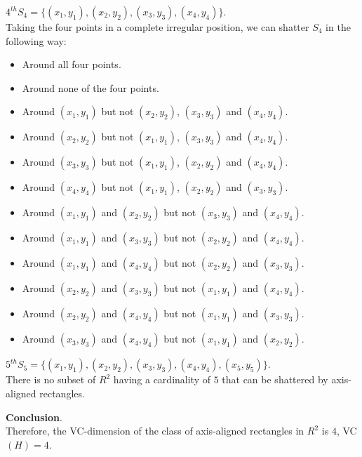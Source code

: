 \begin{example}[title = {Axis-Aligned Rectangles in $\mathbb{R}^2$}]
    $4^{th} S_4 = \{(x_1, y_1), (x_2, y_2), (x_3, y_3), (x_4, y_4)\}$. \\
    Taking the four points in a complete irregular position, we can shatter $S_4$ in the following way:
    \begin{itemize}
        \renewcommand{\labelitemi}{-}
        \item Around all four points.
        \item Around none of the four points.
        \item Around $(x_1, y_1)$ but not $(x_2, y_2)$, $(x_3, y_3)$ and $(x_4, y_4)$.
        \item Around $(x_2, y_2)$ but not $(x_1, y_1)$, $(x_3, y_3)$ and $(x_4, y_4)$.
        \item Around $(x_3, y_3)$ but not $(x_1, y_1)$, $(x_2, y_2)$ and $(x_4, y_4)$.
        \item Around $(x_4, y_4)$ but not $(x_1, y_1)$, $(x_2, y_2)$ and $(x_3, y_3)$.
        \item Around $(x_1, y_1)$ and $(x_2, y_2)$ but not $(x_3, y_3)$ and $(x_4, y_4)$.
        \item Around $(x_1, y_1)$ and $(x_3, y_3)$ but not $(x_2, y_2)$ and $(x_4, y_4)$.
        \item Around $(x_1, y_1)$ and $(x_4, y_4)$ but not $(x_2, y_2)$ and $(x_3, y_3)$.
        \item Around $(x_2, y_2)$ and $(x_3, y_3)$ but not $(x_1, y_1)$ and $(x_4, y_4)$.
        \item Around $(x_2, y_2)$ and $(x_4, y_4)$ but not $(x_1, y_1)$ and $(x_3, y_3)$.
        \item Around $(x_3, y_3)$ and $(x_4, y_4)$ but not $(x_1, y_1)$ and $(x_2, y_2)$.
    \end{itemize} \vspace{3.5pt}

    $5^{th} S_5 = \{(x_1, y_1), (x_2, y_2), (x_3, y_3), (x_4, y_4), (x_5, y_5)\}$. \\
    There is no subset of $R^2$ having a cardinality of $5$ that can be shattered by axis-aligned rectangles. \vspace{7pt}

    \textbf{Conclusion}. \\
    Therefore, the VC-dimension of the class of axis-aligned rectangles in $R^2$ is $4$, VC$(H) = 4$.
\end{example}